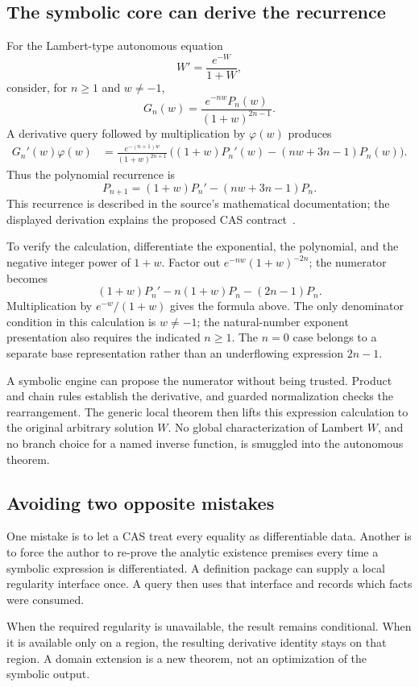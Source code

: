 \documentclass[11pt,a4paper]{article}
\theoremstyle{definition}
\begin{document}
\subsection{The symbolic core can derive the recurrence}
For the Lambert-type autonomous equation
\[
        W'=\frac{e^{-W}}{1+W},
\]
consider, for \(n\ge1\) and \(w\ne-1\),
\[
       G_n(w)=\frac{e^{-nw}P_n(w)}{(1+w)^{2n-1}}.
\]
A derivative query followed by multiplication by \(\varphi(w)\) produces
\begin{align*}
 G_n'(w)\varphi(w)
 &=\frac{e^{-(n+1)w}}{(1+w)^{2n+1}}\,
   \bigl((1+w)P_n'(w)-(nw+3n-1)P_n(w)\bigr).
\end{align*}
Thus the polynomial recurrence is
\[
       P_{n+1}=(1+w)P_n'-(nw+3n-1)P_n.
\]
This recurrence is described in the source's mathematical documentation; the displayed derivation explains the proposed CAS contract~\cite{pode}.

To verify the calculation, differentiate the exponential, the polynomial, and the negative integer power of \(1+w\). Factor out \(e^{-nw}(1+w)^{-2n}\); the numerator becomes
\[
 (1+w)P_n'-n(1+w)P_n-(2n-1)P_n.
\]
Multiplication by \(e^{-w}/(1+w)\) gives the formula above. The only denominator condition in this calculation is \(w\ne-1\); the natural-number exponent presentation also requires the indicated \(n\ge1\). The \(n=0\) case belongs to a separate base representation rather than an underflowing expression \(2n-1\).

A symbolic engine can propose the numerator without being trusted. Product and chain rules establish the derivative, and guarded normalization checks the rearrangement. The generic local theorem then lifts this expression calculation to the original arbitrary solution \(W\). No global characterization of Lambert \(W\), and no branch choice for a named inverse function, is smuggled into the autonomous theorem.

\subsection{Avoiding two opposite mistakes}
One mistake is to let a CAS treat every equality as differentiable data. Another is to force the author to re-prove the analytic existence premises every time a symbolic expression is differentiated. A definition package can supply a local regularity interface once. A query then uses that interface and records which facts were consumed.

When the required regularity is unavailable, the result remains conditional. When it is available only on a region, the resulting derivative identity stays on that region. A domain extension is a new theorem, not an optimization of the symbolic output.
\end{document}
